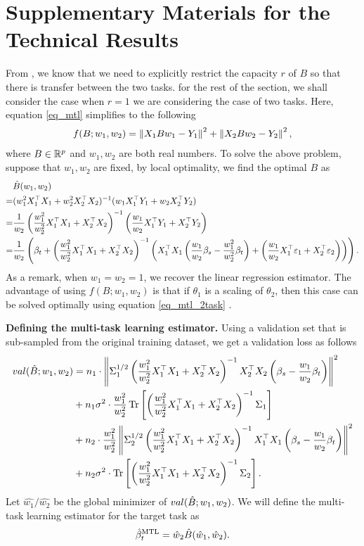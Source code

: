 \section{Supplementary Materials for the Technical Results}\label{app_proof_sec3}

From \cite{WZR20}, we know that we need to explicitly restrict the capacity $r$ of $B$ so that there is transfer between the two tasks.
for the rest of the section, we shall consider the case when $r=1$ we are considering the case of two tasks.
Here, equation \eqref{eq_mtl} simplifies to the following
\begin{align}\label{eq_mtl_2task}
	f(B; w_1, w_2) = \left\| X_1 B w_1 - Y_1 \right\|^2 + \left\| X_2 B w_2 - Y_2 \right\|^2,
\end{align}
where $B\in\mathbb{R}^p$ and $w_1, w_2$ are both real numbers. To solve the above problem, suppose that $w_1, w_2$ are fixed, by local optimality, we find the optimal $B$ as
\begin{align*}
	& \hat{B}(w_1, w_2) \\
	=& (w_1^2 X_1^{\top}X_1 + w_2^2 X_2^{\top}X_2)^{-1} (w_1 X_1^{\top}Y_1 + w_2 X_2^{\top}Y_2) \\
	=& \frac{1}{w_2} \left( \frac{w_1^2}{w_2^2}  X_1^{\top}X_1 + X_2^{\top}X_2\right)^{-1} \left(\frac{w_1}{w_2} X_1^{\top}Y_1 + X_2^{\top}Y_2\right) \\
	=& \frac{1}{w_2}\left({\beta_t + \left(\frac{w_1^2}{w_2^2} X_1^{\top}X_1 + X_2^{\top}X_2\right)^{-1}\left({X_1^{\top}X_1\left(\frac{w_1}{w_2}\beta_s - \frac{w_1^2}{w_2^2} \beta_t\right) + \left(\frac{w_1}{w_2} X_1^{\top}\varepsilon_1 + X_2^{\top}\varepsilon_2\right)}\right)}\right).
\end{align*}
As a remark, when $w_1 = w_2 = 1$, we recover the linear regression estimator.
The advantage of using $f(B; w_1, w_2)$ is that if $\theta_1$ is a scaling of $\theta_2$, then this case can be solved optimally using equation \eqref{eq_mtl_2task} \cite{KD12}.

\textbf{Defining the multi-task learning estimator.}
Using a validation set that is sub-sampled from the original training dataset, we get a validation loss as follows
\begin{align}
		val(\hat{B}; w_1, w_2)
	&=  n_1 \cdot \left\| \Sigma_1^{1/2}\left(\frac{w_1^2}{w_2^2} X_1^{\top}X_1 + X_2^{\top}X_2\right)^{-1}X_2^{\top}X_2\left (\beta_s - \frac{w_1}{w_2}\beta_t\right) \right\|^2 \nonumber \\
		&+ n_1 \sigma^2 \cdot \frac{w_1^2}{w_2^2} \operatorname{Tr}\left[\left(\frac{w_1^2}{w_2^2}  X_1^{\top}X_1 + X_2^{\top}X_2\right)^{-1}\Sigma_1\right] \nonumber \\
		&+ n_2 \cdot \frac{w_1^2}{w_2^2}\left\| \Sigma_2^{1/2}\left(\frac{w_1^2}{w_2^2} X_1^{\top}X_1 + X_2^{\top}X_2\right)^{-1}X_1^{\top}X_1\left(\beta_s - \frac{w_1}{w_2}\beta_t\right) \right\|^2 \nonumber \\
		&+ n_2 \sigma^2 \cdot \operatorname{Tr}\left[\left(\frac{w_1^2}{w_2^2} X_1^{\top}X_1 + X_2^{\top}X_2\right)^{-1}\Sigma_2\right]. \label{eq_val_mtl}
\end{align}
Let $\hat{w_1}/\hat{w_2}$ be the global minimizer of $val(\hat{B}; w_1, w_2)$.
We will define the multi-task learning estimator for the target task as
	\[ \hat{\beta}_t^{\text{MTL}} = \hat{w}_{2}\hat{B}(\hat{w}_1, \hat{w}_2). \]

